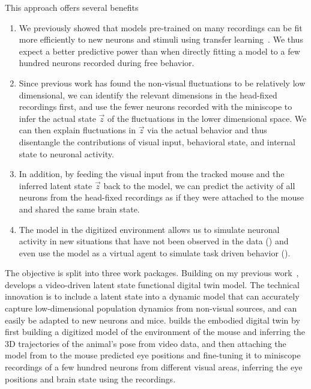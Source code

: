 \documentclass[B2,COG]{ercgrant}
\begin{document}
This approach offers several benefits
\begin{enumerate}[topsep=0pt,itemsep=0.62ex,partopsep=0ex,parsep=0.5ex]
    \item We previously showed that models pre-trained on many recordings can be fit more efficiently to new neurons and stimuli using transfer learning~\parencite{Lurz2020-ua}. We thus expect a better predictive power than when directly fitting a model to a few hundred neurons recorded during free behavior. 
    \item Since previous work has found the non-visual fluctuations to be relatively low dimensional, we can identify the relevant dimensions in the head-fixed recordings first, and use the fewer neurons recorded with the miniscope to infer the actual state $\vec{z}$ of the fluctuations in the lower dimensional space. We can then explain fluctuations in $\vec{z}$ via the actual behavior and thus disentangle the contributions of visual input, behavioral state, and internal state to neuronal activity. 
    \item In addition, by feeding the visual input from the tracked mouse and the inferred latent state $\vec{z}$ back to the model, we can predict the activity of all neurons from the head-fixed recordings as if they were attached to the mouse and shared the same brain state.
    \item The model in the digitized environment allows us to simulate neuronal activity in new situations that have not been observed in the data (\objii) and even use the model as a virtual agent to simulate task driven behavior (\objiii).
\end{enumerate}


The objective is split into three work packages. 
Building on my previous work~\parencite{Sinz2018-sk, Bashiri2021-or},  develops a video-driven latent state functional digital twin model. 
The technical innovation is to include a latent state into a dynamic model that can accurately capture low-dimensional population dynamics from non-visual sources, and can easily be adapted to new neurons and mice. 
 builds the embodied digital twin by first building a digitized model of the environment of the mouse and inferring the 3D trajectories of the animal's pose from video data, and then attaching the model from  to the mouse predicted eye positions and fine-tuning it to  miniscope recordings of a few hundred neurons from different visual areas, inferring the eye positions and brain state using the recordings. 
\end{document}
